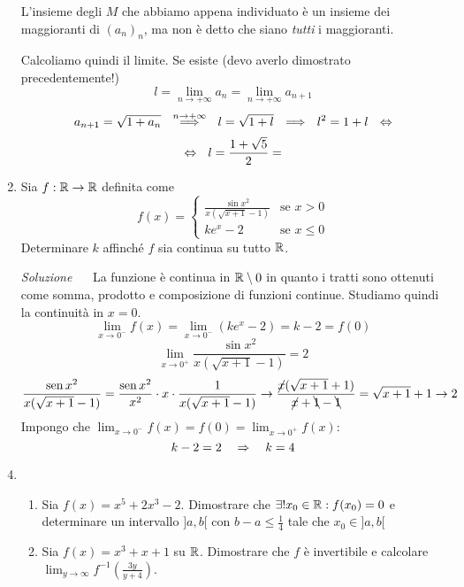 \documentclass{article}
\begin{document}
\begin{enumerate}[label=\textbf{Esercizio 6.\arabic*.},itemindent=*]
\begin{oss}
        L'insieme degli $M$ che abbiamo appena individuato è un insieme dei maggioranti di $(a_n)_n$, ma non è detto che siano \emph{tutti} i maggioranti.
    \end{oss}
    Calcoliamo quindi il limite. Se esiste (devo averlo dimostrato precedentemente!) \[l=\lim_{n\to+\infty}a_n=\lim_{n\to+\infty}a_{n+1}\]
    \[a_{n+1}=\sqrt{1+a_n}~~\overset{n\to+\infty}\Longrightarrow~~l=\sqrt{1+l}~~\Longrightarrow~~l^2=1+l~~\Harr\]
    \[\Harr~~l=\frac{1+\sqrt{5}}{2}=
    \]
    \item Sia $f: \R\to \R$ definita come \[f(x)=\begin{cases}
        \frac{\sin x^2}{x(\sqrt{x+1}-1)}&\text{se }x>0\\
        ke^x-2 & \text{se }x\leq 0
    \end{cases}\]
    Determinare $k$ affinché $f$ sia continua su tutto $\R$.
    \item[\textit{\large Soluzione~}]~
    La funzione è continua in $\R\setminus 0$ in quanto i tratti sono ottenuti come somma, prodotto e composizione di funzioni continue. Studiamo quindi la continuità in $x=0$.
    \[\lim_{x\to0^-}f(x)=\lim_{x\to0^-}(ke^x-2)=k-2=f(0)\]
    \[\lim_{x\to0^+}\frac{\sin x^2}{x(\sqrt{x+1}-1)}=2\]
    \[\frac{\sin x^2}{x(\sqrt{x+1}-1)}=\frac{\sin x^2}{x^2}\cdot x\cdot \frac{1}{x(\sqrt{x+1}-1)}\to\frac{\cancel{x}(\sqrt{x+1}+1)}{\cancel{x}+\bcancel{1}-\bcancel{1}}=\sqrt{x+1}+1\to 2\]
    Impongo che $\lim_{x\to0^-}f(x)=f(0)=\lim_{x\to0^+}f(x)$:
    \[k-2=2~~~\Rarr~~~k=4\]
\item ~
\begin{enumerate}
    \item Sia $f(x)=x^5+2x^3-2$. Dimostrare che $\exists!x_0\in \R:f(x_0)=0$ e determinare un intervallo $]a,b[$ con $ b-a\leq{\scriptstyle\frac{1}{4}}$ tale che $x_0\in]a,b[$
    \item Sia $f(x)=x^3+x+1$ su $\R$. Dimostrare che $f$ è invertibile e calcolare $\lim_{y\to \infty}f^{-1}\left( \frac{3y}{y+4} \right)$.


\end{enumerate}
\end{enumerate}
\end{document}
